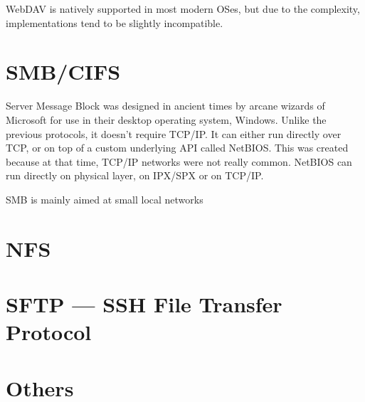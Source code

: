 WebDAV is natively supported in most modern OSes, but due to the complexity, implementations tend to be
slightly incompatible.

\section{SMB/CIFS}

Server Message Block was designed in ancient times by arcane wizards of Microsoft for use in their desktop
operating system, Windows. Unlike the previous protocols, it doesn't require TCP/IP. It can either run
directly over TCP, or on top of a custom underlying API called NetBIOS. This was created because at that time,
TCP/IP networks were not really common. NetBIOS can run directly on physical layer, on IPX/SPX or on TCP/IP.

SMB is mainly aimed at small local networks

\section{NFS}

\section{SFTP --- SSH File Transfer Protocol}

\section{Others}
